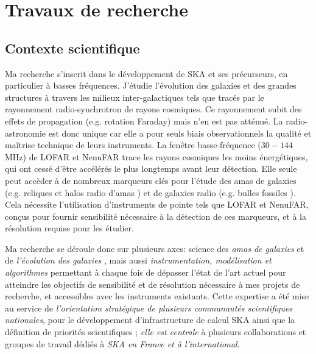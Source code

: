 
\chapter{Travaux de recherche} 


\section{Contexte scientifique}


\pg
Ma recherche s'inscrit dans le d\'eveloppement de SKA et ses pr\'ecurseurs, en particulier \`a basses fr\'equences. J'\'etudie l'\'evolution des galaxies et des grandes structures \`a travers les milieux inter-galactiques tels que trac\'es par le rayonnement radio-synchrotron de rayons cosmiques. Ce rayonnement subit des effets de propagation (e.g. rotation Faraday) mais n'en est pas att\'enu\'e. La radio-astronomie est donc unique car elle a pour seuls biais observationnels la qualité et maîtrise technique de leurs instruments.
La fenêtre basse-fréquence ($30-144$\,MHz) de LOFAR et NenuFAR trace les rayons cosmiques les moins énergétiques,
qui ont cess\'e d'\^etre acc\'el\'er\'es le plus longtemps avant leur d\'etection. Elle seule peut acc\`eder \`a de nombreux marqueurs cl\'es pour l'\'etude des amas de galaxies (e.g. reliques et halos radio d'amas \cite{2019SSRv..215...16V}) et de galaxies radio (e.g. bulles fossiles \cite{2021NatAs...5.1261B}). Cela n\'ecessite l'utilisation d'instruments de pointe tels que LOFAR et NenuFAR, con\c{c}us pour fournir sensibilit\'e n\'ecessaire \`a la d\'etection de ces marqueurs, et \`a la r\'esolution requise pour les \'etudier. %

\pg
Ma recherche se d\'eroule donc sur plusieurs axes: science des \textit{amas de galaxies} \cite[e.g.][]{2021Galax...9..105B, 2021AA...646A..56R, 2021ApJ...907...32B} et de \textit{l'\'evolution des galaxies} \cite{2022A&A...658A..10B, 2022A&A...663A..44K}, mais aussi \textit{instrumentation, mod\'elisation et algorithmes} \cite{2020AA...637A..51B, 2018AA...615A..66B} permettant \`a chaque fois de d\'epasser l'\'etat de l'art actuel pour atteindre les objectifs de sensibilit\'e et de r\'esolution n\'ecessaire \`a mes projets de recherche, et accessibles avec les instruments existants. Cette expertise a \'et\'e mise au service de \textit{l'orientation strat\'egique de plusieurs communaut\'es scientifiques nationales}, pour le d\'eveloppement d'infrastructure de calcul SKA \cite{2022arXiv220111526T} ainsi que la d\'efinition de priorit\'es scientifiques \cite{2023arXiv231110056K}; \textit{elle est centrale} \`a plusieurs collaborations et groupes de travail d\'edi\'es \`a \textit{SKA en France et \`a l'international}.






